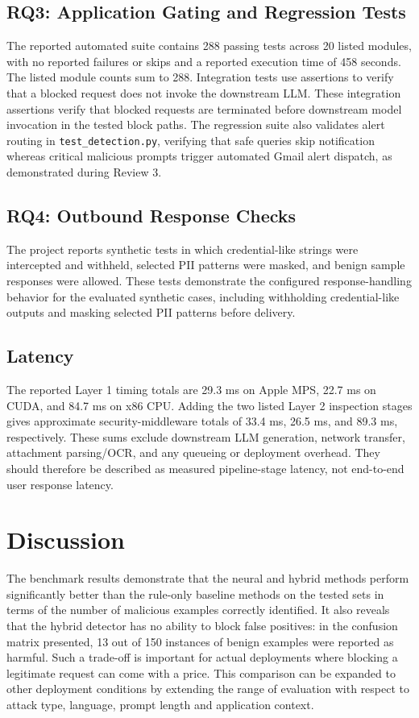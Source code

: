 \documentclass[conference]{IEEEtran}
\begin{document}
\subsection{RQ3: Application Gating and Regression Tests}
The reported automated suite contains 288 passing tests across 20 listed modules, with no reported failures or skips and a reported execution time of 458 seconds. The listed module counts sum to 288. Integration tests use assertions to verify that a blocked request does not invoke the downstream LLM. These integration assertions verify that blocked requests are terminated before downstream model invocation in the tested block paths. The regression suite also validates alert routing in \texttt{test\_detection.py}, verifying that safe queries skip notification whereas critical malicious prompts trigger automated Gmail alert dispatch, as demonstrated during Review 3.

\subsection{RQ4: Outbound Response Checks}
The project reports synthetic tests in which credential-like strings were intercepted and withheld, selected PII patterns were masked, and benign sample responses were allowed. These tests demonstrate the configured response-handling behavior for the evaluated synthetic cases, including withholding credential-like outputs and masking selected PII patterns before delivery.

\subsection{Latency}
The reported Layer 1 timing totals are 29.3 ms on Apple MPS, 22.7 ms on CUDA, and 84.7 ms on x86 CPU. Adding the two listed Layer 2 inspection stages gives approximate security-middleware totals of 33.4 ms, 26.5 ms, and 89.3 ms, respectively. These sums exclude downstream LLM generation, network transfer, attachment parsing/OCR, and any queueing or deployment overhead. They should therefore be described as measured pipeline-stage latency, not end-to-end user response latency.

\section{Discussion}
The benchmark results demonstrate that the neural and hybrid methods perform significantly better than the rule-only baseline methods on the tested sets in terms of the number of malicious examples correctly identified. It also reveals that the hybrid detector has no ability to block false positives: in the confusion matrix presented, 13 out of 150 instances of benign examples were reported as harmful. Such a trade-off is important for actual deployments where blocking a legitimate request can come with a price. This comparison can be expanded to other deployment conditions by extending the range of evaluation with respect to attack type, language, prompt length and application context.
\end{document}

